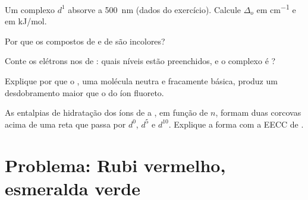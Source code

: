 \begin{exercise}[$\star\star$]\label{exo:b2:ligand-field:8}
Um complexo $d^1$ absorve a \qty{500}{nm} (dados do exercício). Calcule $\Delta_o$ em
\unit{cm^{-1}} e em \unit{kJ/mol}.
\end{exercise}

\begin{exercise}[$\star\star$]\label{exo:b2:ligand-field:9}
Por que os compostos de  e de  são incolores?
\end{exercise}

\begin{exercise}[$\star\star\star$]\label{exo:b2:ligand-field:10}
Conte os elétrons nos  de : quais níveis estão
preenchidos, e o complexo é ?
\end{exercise}

\begin{exercise}[$\star\star\star$]\label{exo:b2:ligand-field:11}
Explique por que o , uma molécula neutra e fracamente básica, produz um
desdobramento maior que o do íon fluoreto.
\end{exercise}

\begin{exercise}[$\star\star\star$]\label{exo:b2:ligand-field:12}
As entalpias de hidratação dos íons  de  a , em função
de $n$, formam duas corcovas acima de uma reta que passa por $d^0$, $d^5$ e
$d^{10}$. Explique a forma com a EECC de .
\end{exercise}

\section{Problema: Rubi vermelho, esmeralda verde}

